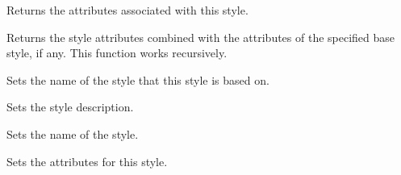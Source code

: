 Returns the attributes associated with this style.

\label{wxrichtextstyledefinitiongetstylemergedwithbase}


Returns the style attributes combined with the attributes of the specified base style, if any. This function works recursively.

\label{wxrichtextstyledefinitionsetbasestyle}


Sets the name of the style that this style is based on.

\label{wxrichtextstyledefinitionsetdescription}


Sets the style description.

\label{wxrichtextstyledefinitionsetname}


Sets the name of the style.

\label{wxrichtextstyledefinitionsetstyle}


Sets the attributes for this style.

